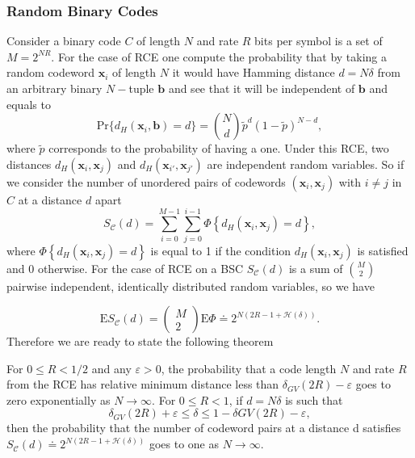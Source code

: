 \subsubsection{Random Binary Codes}
Consider a binary code $C$ of length $N$ and rate $R$ bits per symbol is a set of $M=2^{NR}$. For the case of RCE one compute the probability that by taking a random codeword $\mathbf{x}_i$ of length $N$ it would have Hamming distance $d=N\delta$ from an arbitrary binary $N-$tuple $\mathbf{b}$ and see that it will be independent of $\mathbf{b}$ and equals to
\begin{equation}
\text{Pr}\{d_H(\mathbf{x}_i,\mathbf{b})=d\}={N\choose d} \tilde{p}^d (1-\tilde{p})^{N-d},
\end{equation}
where $\tilde{p}$ corresponds to the probability of having a one. Under this RCE, two distances $d_H(\mathbf{x}_i,\mathbf{x}_j)$ and $d_H(\mathbf{x}_{i'},\mathbf{x}_{j'})$ are independent random variables. So if we consider the number of unordered pairs of codewords $(\mathbf{x}_i,\mathbf{x}_j)$ with $i\neq j$ in $C$ at a distance $d$ apart
\begin{equation}
S_{\mathcal{C}}(d)=\sum_{i=0}^{M-1} \sum_{j=0}^{i-1} \Phi\left\{d_{H}\left(\boldsymbol{x}_{i}, \boldsymbol{x}_{j}\right)=d\right\},
\end{equation}
where $\Phi\left\{d_{H}\left(\boldsymbol{x}_{i}, \boldsymbol{x}_{j}\right)=d\right\}$ is equal to 1 if the condition $d_H(\mathbf{x}_i,\mathbf{x}_j)$ is satisfied and $0$ otherwise. For the case of RCE on a BSC $S_{\mathcal{C}}(d)$ is a sum of ${M\choose 2}$ pairwise independent, identically distributed random variables, so we have

\begin{equation}
\mathrm{E} S_{\mathcal{C}}(d)=\left(\begin{array}{c}
M \\
2
\end{array}\right) \mathrm{E} \Phi \doteq 2^{N(2 R-1+\mathcal{H}(\delta))}.
\end{equation}
\indent Therefore we are ready to state the following theorem
\begin{theorem}
For $0\leq R< 1/2$ and any $\varepsilon>0$, the probability that a code length $N$ and rate $R$ from the RCE has relative minimum distance less than $\delta_{GV}(2R)-\varepsilon$ goes to zero exponentially as $N\to \infty$. For $0\leq R < 1$, if $d=N\delta$ is such that
\begin{equation}
\delta_{GV}(2R)+\varepsilon \leq \delta \leq 1- \delta{GV}(2R) - \varepsilon,
\end{equation}
then the probability that the number of codeword pairs at a distance d satisfies $S_{\mathcal{C}}(d) \doteq 2^{N(2 R-1+\mathcal{H}(\delta))}$ goes to one as $N\to \infty$.
\end{theorem}

